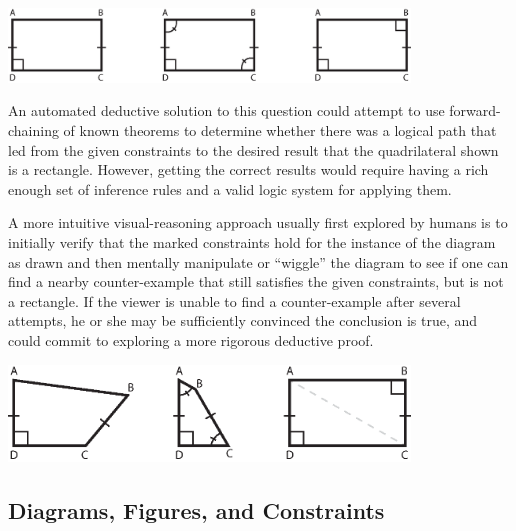 \begin{center}
\includegraphics[width=0.80\textwidth]{diagrams/rectangles.eps}
\end{center}


An automated deductive solution to this question could attempt to use
forward-chaining of known theorems to determine whether there was a
logical path that led from the given constraints to the desired result
that the quadrilateral shown is a rectangle.  However, getting the
correct results would require having a rich enough set of inference
rules and a valid logic system for applying them.

A more intuitive visual-reasoning approach usually first explored by
humans is to initially verify that the marked constraints hold for the
instance of the diagram as drawn and then mentally manipulate or
``wiggle'' the diagram to see if one can find a nearby counter-example
that still satisfies the given constraints, but is not a rectangle.
If the viewer is unable to find a counter-example after several
attempts, he or she may be sufficiently convinced the conclusion is
true, and could commit to exploring a more rigorous deductive proof.

\begin{center}
\includegraphics[width=0.80\textwidth]{diagrams/rectangles-answer.eps}
\end{center}


\subsection{Diagrams, Figures, and Constraints}

